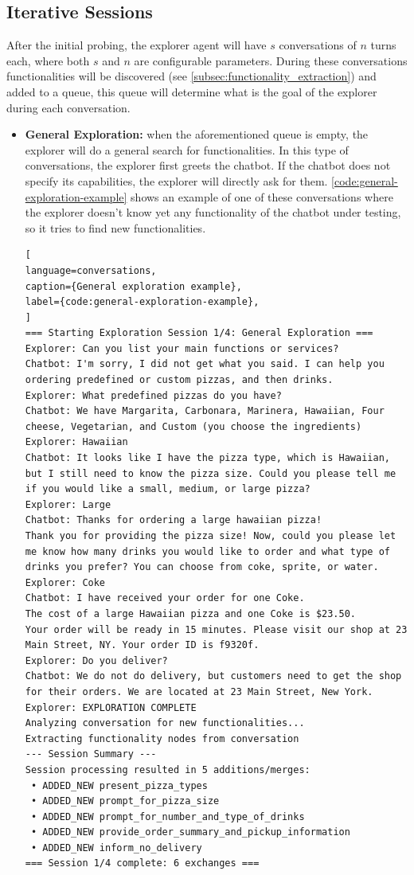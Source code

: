 \subsection{Iterative Sessions}

After the initial probing,
the explorer agent will have $s$ conversations of $n$ turns each,
where both $s$ and $n$ are configurable parameters.
During these conversations functionalities will be discovered
(see \autoref{subsec:functionality_extraction})
and added to a queue,
this queue will determine what is the goal of the explorer
during each conversation.

\begin{itemize}
  \item \textbf{General Exploration:}
    when the aforementioned queue is empty,
    the explorer will do a general search for functionalities.
    In this type of conversations,
    the explorer first greets the chatbot.
    If the chatbot does not specify its capabilities,
    the explorer will directly ask for them.
    \autoref{code:general-exploration-example}
    shows an example of one of these conversations
    where the explorer doesn't know yet any
    functionality of the chatbot under testing,
    so it tries to find new functionalities.

\begin{lstlisting}[
language=conversations,
caption={General exploration example},
label={code:general-exploration-example},
]
=== Starting Exploration Session 1/4: General Exploration ===
Explorer: Can you list your main functions or services?
Chatbot: I'm sorry, I did not get what you said. I can help you ordering predefined or custom pizzas, and then drinks.
Explorer: What predefined pizzas do you have?
Chatbot: We have Margarita, Carbonara, Marinera, Hawaiian, Four cheese, Vegetarian, and Custom (you choose the ingredients)
Explorer: Hawaiian
Chatbot: It looks like I have the pizza type, which is Hawaiian, but I still need to know the pizza size. Could you please tell me if you would like a small, medium, or large pizza?
Explorer: Large
Chatbot: Thanks for ordering a large hawaiian pizza!
Thank you for providing the pizza size! Now, could you please let me know how many drinks you would like to order and what type of drinks you prefer? You can choose from coke, sprite, or water.
Explorer: Coke
Chatbot: I have received your order for one Coke.
The cost of a large Hawaiian pizza and one Coke is $23.50.
Your order will be ready in 15 minutes. Please visit our shop at 23 Main Street, NY. Your order ID is f9320f.
Explorer: Do you deliver?
Chatbot: We do not do delivery, but customers need to get the shop for their orders. We are located at 23 Main Street, New York.
Explorer: EXPLORATION COMPLETE
Analyzing conversation for new functionalities...
Extracting functionality nodes from conversation
--- Session Summary ---
Session processing resulted in 5 additions/merges:
 • ADDED_NEW present_pizza_types
 • ADDED_NEW prompt_for_pizza_size
 • ADDED_NEW prompt_for_number_and_type_of_drinks
 • ADDED_NEW provide_order_summary_and_pickup_information
 • ADDED_NEW inform_no_delivery
=== Session 1/4 complete: 6 exchanges ===
\end{lstlisting}


\end{itemize}
